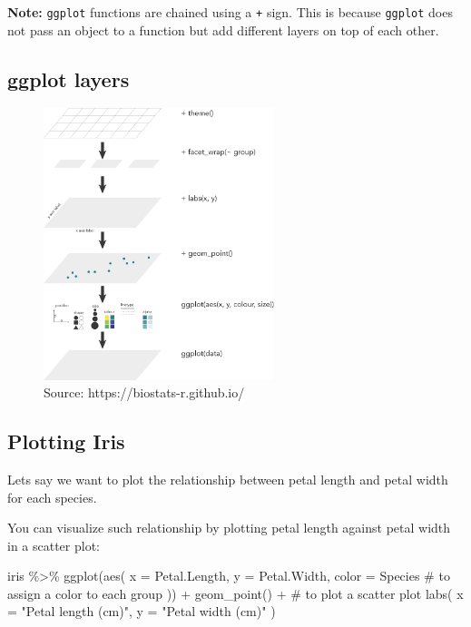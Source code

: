 \documentclass[
  letterpaper,
  DIV=11,
  numbers=noendperiod,
  oneside]{scrartcl}
\newenvironment{Shaded}{\begin{snugshade}}{\end{snugshade}}
\newcommand{\AttributeTok}[1]{\textcolor[rgb]{0.40,0.45,0.13}{#1}}
\newcommand{\CommentTok}[1]{\textcolor[rgb]{0.37,0.37,0.37}{#1}}
\newcommand{\FunctionTok}[1]{\textcolor[rgb]{0.28,0.35,0.67}{#1}}
\newcommand{\NormalTok}[1]{\textcolor[rgb]{0.00,0.23,0.31}{#1}}
\newcommand{\SpecialCharTok}[1]{\textcolor[rgb]{0.37,0.37,0.37}{#1}}
\newcommand{\StringTok}[1]{\textcolor[rgb]{0.13,0.47,0.30}{#1}}
\begin{document}
\textbf{Note:} \texttt{ggplot} functions are chained using a \texttt{+}
sign. This is because \texttt{ggplot} does not pass an object to a
function but add different layers on top of each other.

\subsection{ggplot layers}\label{ggplot-layers}

\begin{figure}[H]

{\centering \includegraphics[width=0.6\textwidth,height=\textheight]{Intro_R_files/mediabag/ggplot_setup.png}

}

\caption{Source: https://biostats-r.github.io/}

\end{figure}%

\subsection{Plotting Iris}\label{plotting-iris}

Lets say we want to plot the relationship between petal length and petal
width for each species.

You can visualize such relationship by plotting petal length against
petal width in a scatter plot:

\begin{Shaded}
\begin{Highlighting}[]
\NormalTok{iris }\SpecialCharTok{\%\textgreater{}\%} 
  \FunctionTok{ggplot}\NormalTok{(}\FunctionTok{aes}\NormalTok{(}
    \AttributeTok{x =}\NormalTok{ Petal.Length,}
    \AttributeTok{y =}\NormalTok{ Petal.Width,}
    \AttributeTok{color =}\NormalTok{ Species }\CommentTok{\# to assign a color to each group}
\NormalTok{  )) }\SpecialCharTok{+}
  \FunctionTok{geom\_point}\NormalTok{() }\SpecialCharTok{+} \CommentTok{\# to plot a scatter plot}
  \FunctionTok{labs}\NormalTok{(}
    \AttributeTok{x =} \StringTok{"Petal length (cm)"}\NormalTok{,}
    \AttributeTok{y =} \StringTok{"Petal width (cm)"}
\NormalTok{  )}
\end{Highlighting}
\end{Shaded}
\end{document}
